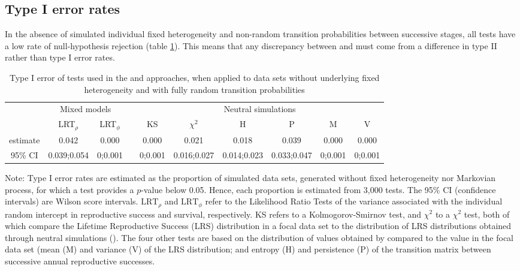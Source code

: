 \subsection{Type I error rates}
In the absence of simulated individual fixed heterogeneity and non-random transition probabilities between successive stages, all tests have a low rate of null-hypothesis rejection (table \ref{table:t1error}). This means that any discrepancy between \NSM and \MM must come from a difference in type II rather than type I error rates.
\begin{table}[H]
\caption{Type I error of tests used in the \MM and \NSM approaches, when applied to data sets without underlying fixed heterogeneity and with fully random transition probabilities}
\begin{center}\scriptsize
\begin{tabular}{c c c c c c c c c c}
\toprule
& \multicolumn{2}{c}{Mixed models} & & \multicolumn{6}{c}{Neutral simulations}\\
\cmidrule{2-3} \cmidrule{5-10}%
& LRT$_\rho$ & LRT$_\phi$ & & KS & $\chi^2$ & H & P & M & V\\
\midrule
estimate & 0.042 			& 0.000 		& & 			0.000 & 0.021				& 0.018 			& 0.039 			& 0.000 		& 0.000\\
95\% CI & 0.039;0.054 &	0;0.001		& & 	0;0.001		& 0.016;0.027	& 0.014;0.023	& 0.033;0.047	& 0;0.001		&	0;0.001	\\
\bottomrule
\end{tabular}
\end{center}
{\scriptsize Note: Type I error rates are estimated as the proportion of simulated data sets, generated without fixed heterogeneity nor Markovian process, for which a test provides a $p$-value below 0.05. Hence, each proportion is estimated from 3,000 tests. The 95\% CI (confidence intervals) are Wilson score intervals. $\mathrm{LRT}_\rho$ and $\mathrm{LRT}_\phi$ refer to the Likelihood Ratio Tests of the variance associated with the individual random intercept in reproductive success and survival, respectively. KS refers to a Kolmogorov-Smirnov test, and $\chi^2$ to a $\chi^2$ test, both of which compare the Lifetime Reproductive Success (LRS) distribution in a focal data set to the distribution of LRS distributions obtained through neutral simulations (\NSM). The four other tests are based on the distribution of values obtained by \NSM compared to the value in the focal data set (mean (M) and variance (V) of the LRS distribution; and entropy (H) and persistence (P) of the transition matrix between successive annual reproductive successes.}
\label{table:t1error}
\end{table}

